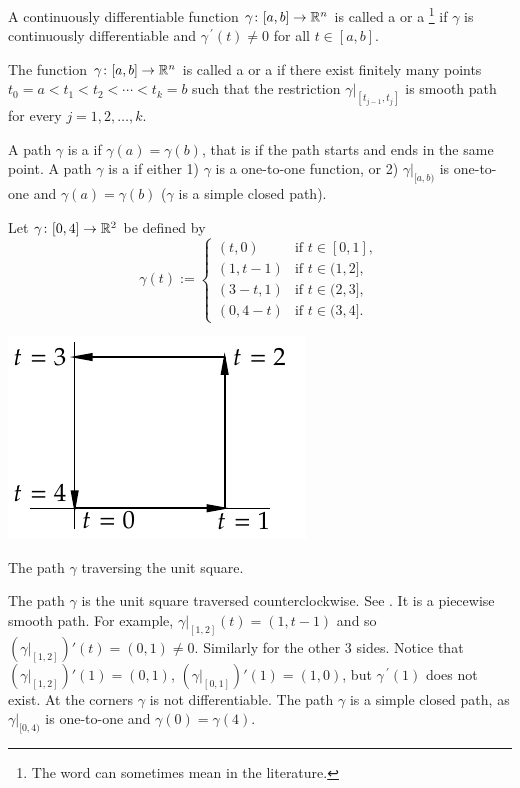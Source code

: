 \begin{defn}
A continuously differentiable function $\gamma \colon [a,b] \to {\mathbb{R}}^n$ is
called a \emph{}
or a
\emph{}\footnote{The
word  can sometimes mean
 in the literature.}
if
$\gamma$ is continuously differentiable and
$\gamma^{\:\prime}(t) \not= 0$ for all $t \in [a,b]$.

The function $\gamma \colon [a,b] \to {\mathbb{R}}^n$ is called a
\emph{} or a
\emph{}
if there exist finitely many points
$t_0 = a < t_1 < t_2 < \cdots < t_k = b$ such that
the restriction $\gamma|_{[t_{j-1},t_j]}$ is smooth path for every
$j=1,2,\ldots,k$.

A path $\gamma$ is 
a \emph{} if $\gamma(a) = \gamma(b)$, that is
if the path starts and ends in the same point.
A path $\gamma$ is a \emph{} if 
either 1) $\gamma$ is a one-to-one function, or 2)
$\gamma|_{[a,b)}$ is one-to-one and $\gamma(a)=\gamma(b)$ ($\gamma$ is a
simple closed path).
\end{defn}


\begin{example} \label{mv:example:unitsquarepath}
Let $\gamma \colon [0,4] \to {\mathbb{R}}^2$ be defined by
\begin{equation*}
\gamma(t) :=
\begin{cases}
(t,0)   & \text{if } t \in [0,1],\\
(1,t-1) & \text{if } t \in (1,2],\\
(3-t,1) & \text{if } t \in (2,3],\\
(0,4-t) & \text{if } t \in (3,4].
\end{cases}
\end{equation*}
\begin{myfigureht}
\includegraphics{figures/squarepath}
\caption{The path $\gamma$ traversing the unit square.\label{fig:squarepath}}
\end{myfigureht}

The path $\gamma$ is the unit square traversed
counterclockwise.  See .  It is
a piecewise smooth path.  For example,
$\gamma|_{[1,2]}(t) = (1,t-1)$ and so
$(\gamma|_{[1,2]})'(t) = (0,1) \not= 0$.  Similarly for the other 3 sides.
Notice
that
$(\gamma|_{[1,2]})'(1) = (0,1)$,
$(\gamma|_{[0,1]})'(1) = (1,0)$, but
$\gamma^{\:\prime}(1)$ does not exist.  At the corners $\gamma$ is 
not differentiable.
The path $\gamma$ is a simple closed path, as $\gamma|_{[0,4)}$ is
one-to-one and $\gamma(0)=\gamma(4)$.
\end{example}

